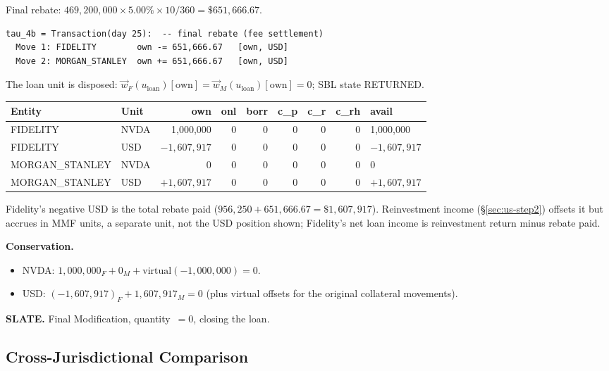 \documentclass[11pt,a4paper]{article}
\begin{document}
\noindent Final rebate: $469{,}200{,}000 \times 5.00\% \times 10/360 = \$651{,}666.67$.

\begin{lstlisting}
tau_4b = Transaction(day 25):  -- final rebate (fee settlement)
  Move 1: FIDELITY        own -= 651,666.67   [own, USD]
  Move 2: MORGAN_STANLEY  own += 651,666.67   [own, USD]
\end{lstlisting}

\noindent The loan unit is disposed: $\vec{w}_F(u_{\mathrm{loan}})[\mathrm{own}] = \vec{w}_M(u_{\mathrm{loan}})[\mathrm{own}] = 0$; SBL state RETURNED.

\begin{center}\small
\begin{tabular}{l l r r r r r r l}
\toprule
\textbf{Entity} & \textbf{Unit} & own & onl & borr & c\_p & c\_r & c\_rh & avail \\
\midrule
FIDELITY & NVDA & 1{,}000{,}000 & 0 & 0 & 0 & 0 & 0 & 1{,}000{,}000 \\
FIDELITY & USD & $-1{,}607{,}917$ & 0 & 0 & 0 & 0 & 0 & $-1{,}607{,}917$ \\
\midrule
MORGAN\_STANLEY & NVDA & 0 & 0 & 0 & 0 & 0 & 0 & 0 \\
MORGAN\_STANLEY & USD & $+1{,}607{,}917$ & 0 & 0 & 0 & 0 & 0 & $+1{,}607{,}917$ \\
\bottomrule
\end{tabular}
\end{center}

\noindent Fidelity's negative USD is the total rebate paid ($956{,}250 + 651{,}666.67 = \$1{,}607{,}917$). Reinvestment income (\S\ref{sec:us-step2}) offsets it but accrues in MMF units, a separate unit, not the USD position shown; Fidelity's net loan income is reinvestment return minus rebate paid.

\medskip
\noindent\textbf{Conservation.}
\begin{itemize}[nosep]
\item NVDA: $1{,}000{,}000_F + 0_M + \text{virtual}(-1{,}000{,}000) = 0$. \checkmark
\item USD: $(-1{,}607{,}917)_F + 1{,}607{,}917_M = 0$ (plus virtual offsets for the original collateral movements). \checkmark
\end{itemize}

\noindent\textbf{SLATE.} Final Modification, quantity~$=0$, closing the loan.

\subsection{Cross-Jurisdictional Comparison}
\label{sec:sbl-comparison}
\end{document}
